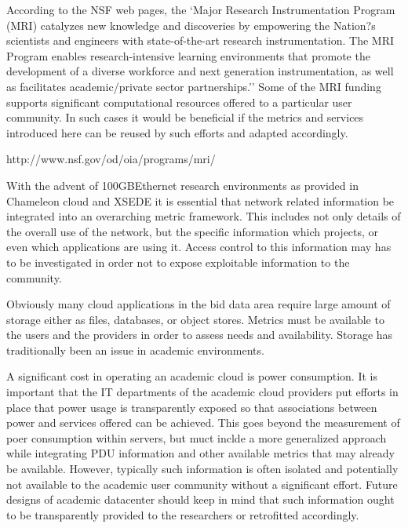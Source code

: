 \documentclass{sig-alternate-05-2015}
\begin{document}
\begin{description}
\setlength\itemsep{-2pt}

\item[\it MRIs.] According to the NSF web pages, the `Major Research
  Instrumentation Program (MRI) catalyzes new knowledge and
  discoveries by empowering the Nation?s scientists and engineers with
  state-of-the-art research instrumentation. The MRI Program enables
  research-intensive learning environments that promote the
  development of a diverse workforce and next generation
  instrumentation, as well as facilitates academic/private sector
  partnerships.'' Some of the MRI funding supports significant
  computational resources offered to a particular user community. In
  such cases it would be beneficial if the metrics and services
  introduced here can be reused by such efforts and adapted
  accordingly. 

http://www.nsf.gov/od/oia/programs/mri/

\item[\it Networks.] With the advent of 100GBEthernet research
  environments as provided in Chameleon cloud and XSEDE it is
  essential that network related information be integrated into an
  overarching metric framework. This includes not only details of the
  overall use of the network, but the specific information which
  projects, or even which applications are using it. Access control to
  this information may has to be investigated in order not to expose
  exploitable information to the community.

\item[\it Storage.] Obviously many cloud applications in the bid data
  area require large amount of storage either as files, databases, or
  object stores. Metrics must be available to the users and the
  providers in order to assess needs and availability. Storage has
  traditionally been an issue in academic environments.

\item[\it Power.] A significant cost in operating an academic cloud is
  power consumption. It is important that the IT departments of the
  academic cloud providers put efforts in place that power usage is
  transparently exposed so that associations between power and
  services offered can be achieved. This goes beyond the measurement
  of poer consumption within servers, but muct inclde a more
  generalized approach while integrating PDU information and other
  available metrics that may already be available. However, typically
  such information is often isolated and potentially not available to
  the academic user community without a significant effort. Future
  designs of academic datacenter should keep in mind that such
  information ought to be transparently provided to the researchers or
  retrofitted accordingly.


\end{description}
\end{document}
